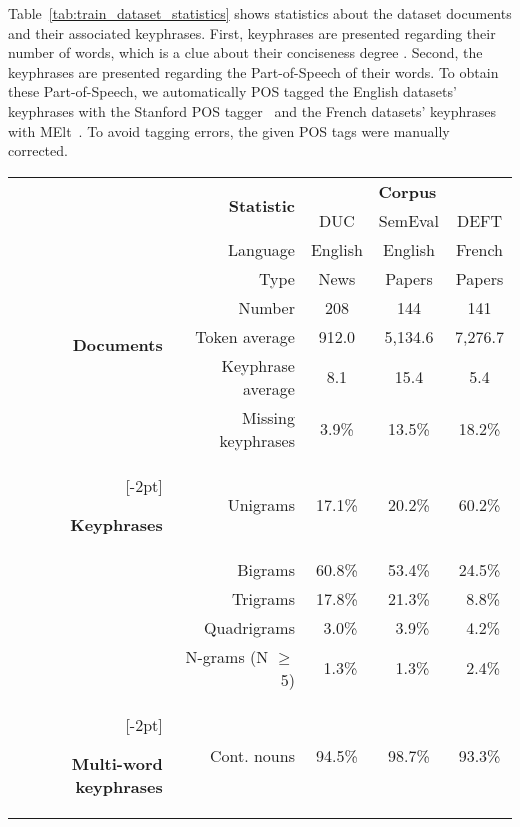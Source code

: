     Table~\ref{tab:train_dataset_statistics} shows statistics about the dataset
    documents and their associated keyphrases. First, keyphrases are presented
    regarding their number of words, which is a clue about their conciseness
    degree . Second, the keyphrases are presented regarding
    the Part-of-Speech of their words. To obtain these Part-of-Speech, we
    automatically POS tagged the English datasets' keyphrases with the Stanford
    POS tagger~\cite{toutanova2003stanfordpostagger} and the French datasets'
    keyphrases with MElt~\cite{denis2009melt}. To avoid tagging errors, the
    given POS tags were manually corrected.
    \begin{table}[h]
      \centering
      \begin{tabular}{@{~}r@{~}r@{~}c@{~}c@{~}c@{~}}
        \toprule
        & \multirow{2}{*}[-2pt]{\textbf{Statistic}} & \multicolumn{3}{c}{\textbf{Corpus}}\\
        \cmidrule{3-5}
        & & DUC & SemEval & DEFT\\
        \midrule
        \multirow{6}{*}[-2pt]{\begin{sideways}\textbf{Documents}\end{sideways}} & Language & English & English & French\\
        & Type & News & Papers & Papers\\
        & Number & 208 & 144 & 141\\
        & Token average & 912.0 & 5,134.6 & 7,276.7\\
        & Keyphrase average & 8.1 & 15.4 & 5.4\\
        & Missing keyphrases & 3.9\% & 13.5\% & 18.2\%\\
        \addlinespace[1.5\defaultaddspace]
        \multirow{5}{*}[-2pt]{\begin{sideways}\textbf{Keyphrases}\end{sideways}} & Unigrams & 17.1\% & 20.2\% & 60.2\%\\
        & Bigrams & 60.8\% & 53.4\% & 24.5\%\\
        & Trigrams & 17.8\% & 21.3\% & $~~$8.8\%\\
        & Quadrigrams & $~~$3.0\% & $~~$3.9\% & $~~$4.2\%\\
        & N-grams (N $\geq$ 5) & $~~$1.3\% & $~~$1.3\% & $~~$2.4\%\\
        \addlinespace[1.5\defaultaddspace]
        \multirow{5}{*}[-2pt]{\begin{sideways}\textbf{Multi-word keyphrases}\end{sideways}} & Cont. nouns & 94.5\% & 98.7\% & 93.3\%\\

\end{tabular}
\end{table}

